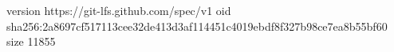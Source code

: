 version https://git-lfs.github.com/spec/v1
oid sha256:2a8697cf517113cee32de413d3af114451c4019ebdf8f327b98ce7ea8b55bf60
size 11855
